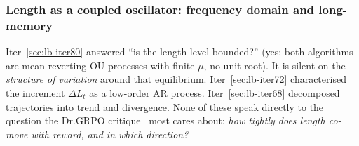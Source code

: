 
\subsubsection{Length as a coupled oscillator: frequency domain and long-memory}\label{sec:lb-iter84}

Iter~\ref{sec:lb-iter80} answered ``is the length level bounded?'' (yes: both
algorithms are mean-reverting OU processes with finite $\mu$, no unit root).
It is silent on the \emph{structure of variation} around that equilibrium.
Iter~\ref{sec:lb-iter72} characterised the increment $\Delta L_t$ as a
low-order AR process. Iter~\ref{sec:lb-iter68} decomposed trajectories into
trend and divergence. None of these speak directly to the question the
Dr.GRPO critique~\citep{liu2025drgrpo} most cares about: \emph{how tightly
does length co-move with reward, and in which direction?}

